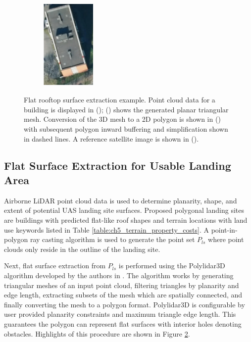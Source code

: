 \begin{figure}[t]
\begin{subfigure}[b]{0.5\linewidth}
    \centering\includegraphics[width=75pt,height=125pt]{chapter_5_mapping/imgs/74200284_satellite_simple.pdf}
    \caption{\label{fig:ch5_satellite_example}}
  \end{subfigure}%
  \caption[Flat surface extraction from rooftops]{Flat rooftop surface extraction example. Point cloud data for a building is displayed in (); () shows the generated planar triangular mesh.  Conversion of the 3D mesh to a 2D polygon is shown in () with subsequent polygon inward buffering and simplification shown in dashed lines.  A reference satellite image is shown in ().}
  \label{fig:ch5_example_usable}
\end{figure}

\subsection{Flat Surface Extraction for Usable Landing Area}\label{sec:ch5_usable_area}

Airborne LiDAR point cloud data is used to determine planarity, shape, and extent of potential \ac{UAS} landing site surfaces.  %
Proposed polygonal landing sites are buildings with predicted flat-like roof shapes and terrain locations with land use keywords listed in Table \ref{table:ch5_terrain_property_costs}.  A point-in-polygon ray casting algorithm is used to generate the point set $P_{ls}$ \cite{samosky_sectionviewsystem_1993} where point clouds only reside in the outline of the landing site. 

Next, flat surface extraction from $P_{ls}$ is performed using the Polylidar3D algorithm developed by the authors in \cite{castagno_polylidar3d_2020}. The algorithm works by generating triangular meshes of an input point cloud, filtering triangles by planarity and edge length, extracting subsets of the mesh which are spatially connected, and finally converting the mesh to a polygon format. Polylidar3D is configurable by user provided planarity constraints and maximum triangle edge length. This guarantees the polygon can represent flat surfaces with interior holes denoting obstacles. Highlights of this procedure are shown in Figure \ref{fig:ch5_example_usable}. 

